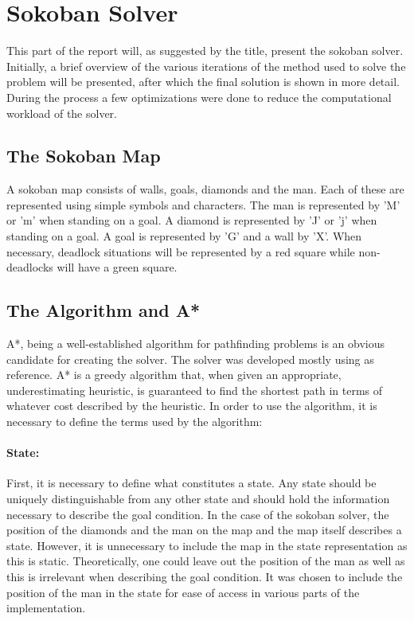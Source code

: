 \section{Sokoban Solver}
This part of the report will, as suggested by the title, present the sokoban solver.
Initially, a brief overview of the various iterations of the method used to solve the problem will be presented, after which the final solution is shown in more detail.
During the process a few optimizations were done to reduce the computational workload of the solver.

\subsection{The Sokoban Map}
A sokoban map consists of walls, goals, diamonds and the man. 
Each of these are represented using simple symbols and characters.
The man is represented by 'M' or 'm' when standing on a goal. 
A diamond is represented by 'J' or 'j' when standing on a goal.
A goal is represented by 'G' and a wall by 'X'.
When necessary, deadlock situations will be represented by a red square while non-deadlocks will have a green square.

\subsection{The Algorithm and A*}
A*, being a well-established algorithm for pathfinding problems is an obvious candidate for creating the solver.
The solver was developed mostly using \cite{stanford} as reference.
A* is a greedy algorithm that, when given an appropriate, underestimating heuristic, is guaranteed to find the shortest path in terms of whatever cost described by the heuristic.
In order to use the algorithm, it is necessary to define the terms used by the algorithm:

\paragraph{State:}
First, it is necessary to define what constitutes a state. 
Any state should be uniquely distinguishable from any other state and should hold the information necessary to describe the goal condition.
In the case of the sokoban solver, the position of the diamonds and the man on the map and the map itself describes a state.
However, it is unnecessary to include the map in the state representation as this is static.
Theoretically, one could leave out the position of the man as well as this is irrelevant when describing the goal condition.
It was chosen to include the position of the man in the state for ease of access in various parts of the implementation.

